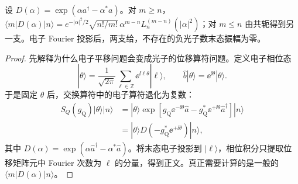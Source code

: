 \begin{lemma}
设 $D(\alpha)=\exp(\alpha a^\dagger-\alpha^*a)$。对 $m\ge n$，$\langle m|D(\alpha)|n\rangle=e^{-|\alpha|^2/2}\sqrt{n!/m!}\,\alpha^{m-n}L_n^{(m-n)}(|\alpha|^2)$；对 $m\le n$ 由共轭得到另一支。电子 Fourier 投影后，两支给，不存在的负光子数末态振幅为零。
\end{lemma}
\begin{proof}
先解释为什么电子平移问题会变成光子的位移算符问题。定义电子相位态
\begin{equation*}
 |\theta\rangle=\frac{1}{\sqrt{2\pi}}
 \sum_{\ell\in\mathbb Z}\ee^{\ii\ell\theta}|\ell\rangle,
 \qquad
 \hat b|\theta\rangle=\ee^{\ii\theta}|\theta\rangle .
\end{equation*}
于是固定 $\theta$ 后，交换算符中的电子算符退化为复数：
\begin{align*}
 S_Q(g_{\mathrm Q})|\theta\rangle|n\rangle
 &=|\theta\rangle
 \exp\!\left[
 g_{\mathrm Q} \ee^{-\ii\theta}\hat a
 -g_{\mathrm Q}^*\ee^{+\ii\theta}\hat a^\dagger
 \right]|n\rangle\\
 &=|\theta\rangle
 D\!\left(-g_{\mathrm Q}^*\ee^{+\ii\theta}\right)|n\rangle ,
\end{align*}
其中 $D(\alpha)=\exp(\alpha\hat a^\dagger-\alpha^*\hat a)$。将末态电子投影到 $|\ell\rangle$，相位积分只提取位移矩阵元中 Fourier 次数为 $\ell$ 的分量，得到正文。真正需要计算的是一般的 $\langle m|D(\alpha)|n\rangle$。


\end{proof}
